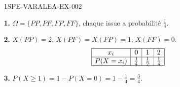 \begin{corrige}{1SPE-VARALEA-EX-002}

\textbf{1.} $\Omega = \{PP, PF, FP, FF\}$, chaque issue a probabilité $\frac{1}{4}$.

\medskip
\textbf{2.} $X(PP)=2$, $X(PF)=X(FP)=1$, $X(FF)=0$.
\[
\begin{array}{|c|c|c|c|}
\hline
x_i & 0 & 1 & 2 \\
\hline
P(X=x_i) & \frac{1}{4} & \frac{1}{2} & \frac{1}{4} \\
\hline
\end{array}
\]

\medskip
\textbf{3.} $P(X \geq 1) = 1 - P(X=0) = 1 - \frac{1}{4} = \frac{3}{4}$.

\end{corrige}
